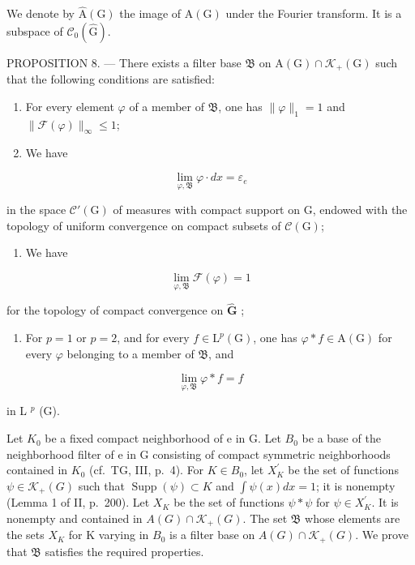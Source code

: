 We denote by \(\widehat{\mathrm{A}}(\mathrm{G})\) the image of \(\mathrm{A}(\mathrm{G})\) under the Fourier transform. It is a subspace of \(\mathcal{C}_0(\widehat{\mathrm{G}})\).

PROPOSITION 8. --- There exists a filter base \(\mathfrak{B}\) on \(\mathrm{A}(\mathrm{G}) \cap \mathcal{K}_{+}(\mathrm{G})\) such that the following conditions are satisfied:

\begin{enumerate}
\def\labelenumi{(\roman{enumi})}
\item
  For every element \(\varphi\) of a member of \(\mathfrak{B}\), one has \(\|\varphi\|_1 = 1\) and \(\|\mathcal{F}(\varphi)\|_{\infty} \leqslant 1\);
\item
  We have
\end{enumerate}

\[
\lim _ {\varphi , \mathfrak {B}} \varphi \cdot d x = \varepsilon_ {e}
\]

in the space \(\mathcal{C}'(\mathrm{G})\) of measures with compact support on G, endowed with the topology of uniform convergence on compact subsets of \(\mathcal{C}(\mathrm{G})\);

\begin{enumerate}
\def\labelenumi{(\roman{enumi})}
\setcounter{enumi}{2}
\tightlist
\item
  We have
\end{enumerate}

\[
\lim _ {\varphi , \mathfrak {B}} \mathcal {F} (\varphi) = 1
\]

for the topology of compact convergence on \(\widehat{\mathbf{G}}\) ;

\begin{enumerate}
\def\labelenumi{(\roman{enumi})}
\setcounter{enumi}{3}
\tightlist
\item
  For \(p = 1\) or \(p = 2\), and for every \(f \in \mathrm{L}^p(\mathrm{G})\), one has \(\varphi * f \in \mathrm{A}(\mathrm{G})\) for every \(\varphi\) belonging to a member of \(\mathfrak{B}\), and
\end{enumerate}

\[
\lim _ {\varphi , \mathfrak {B}} \varphi * f = f
\]

in L \(^{p}\) (G).

Let \(K_{0}\) be a fixed compact neighborhood of e in G. Let \(B_{0}\) be a base of the neighborhood filter of e in G consisting of compact symmetric neighborhoods contained in \(K_{0}\) (cf.~TG, III, p.~4). For \(K \in B_{0}\), let \(X_{K}^{\prime}\) be the set of functions \(\psi \in \mathcal{K}_{+}(G)\) such that \(\operatorname{Supp}(\psi) \subset K\) and \(\int \psi(x)dx = 1\); it is nonempty (Lemma 1 of II, p.~200). Let \(X_{K}\) be the set of functions \(\psi * \psi\) for \(\psi \in X_{K}^{\prime}\). It is nonempty and contained in \(A(G) \cap \mathcal{K}_{+}(G)\). The set \(\mathfrak{B}\) whose elements are the sets \(X_{K}\) for K varying in \(B_{0}\) is a filter base on \(A(G) \cap \mathcal{K}_{+}(G)\). We prove that \(\mathfrak{B}\) satisfies the required properties.

